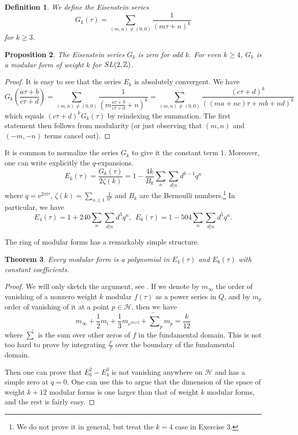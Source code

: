 \documentclass[11pt]{article}
\numberwithin{equation}{section}
\numberwithin{footnote}{section}
\newtheorem{thm}{Theorem}[section]
\newtheorem{prop}[thm]{Proposition}
\newtheorem{defn}[thm]{Definition}
\newcommand{\ee}{{\mathrm e}}
\newcommand{\ii}{{\mathrm i}}
\newcommand{\Z}{{\mathbb Z}}
\begin{document}
\smallskip
\begin{defn}\label{defG}
We define the Eisenstein series
$$G_k(\tau) =  \sum_{(m,n)\neq (0,0)} \frac 1{(m\tau + n)^{k}}$$
for $k\geq 3$. 
\end{defn}

\smallskip
\begin{prop}
The Eisenstein series $G_k$ is zero for odd $k$. For even $k\geq 4$, $G_k$ is a modular form of weight $k$ 
for  ${\rm SL}(2,\Z)$.
\end{prop}

\begin{proof}
It is easy to see that the series $E_k$ is absolutely convergent.
We have
$$
G_k\left(\frac {a\tau + b}{c\tau + d}\right) = \sum_{(m,n)\neq (0,0)} \frac 1{(m\frac {a\tau + b}{c\tau + d}+n)^k}
= \sum_{(m,n)\neq (0,0)} \frac {(c\tau+d)^k}{((ma+nc)\tau + mb+nd)^k}
$$
which equals $(c\tau+d)^k G_k(\tau)$
by reindexing the summation. The first statement then follows from modularity (or just observing that $(m,n)$ and $(-m,-n)$ terms cancel out).
\end{proof}

It is common to normalize the series $G_{k}$ to give it the constant term $1$. Moreover, one can write explicitly the 
$q$-expansions.
$$
E_k(\tau) = \frac {G_k(\tau)}{2\zeta(k)} = 1 - \frac {4k}{B_k} \sum_{n} \sum_{d|n} d^{k-1} q^n
$$
where $q=\ee^{2\pi\ii \tau}$, $\zeta(k) =\sum_{n\geq 1}\frac 1{n^k}$ and $B_k$ are the Bernoulli numbers.\footnote{ We do not prove it in general, but treat the $k=4$ case in Exercise 3.} In particular, we have
\begin{equation}\label{E4E6}
E_4(\tau) = 1 + 240  \sum_{n} \sum_{d|n} d^3 q^n,~~
E_6(\tau) = 1 - 504  \sum_{n} \sum_{d|n} d^5 q^n.
\end{equation}

\smallskip
The ring of modular forms has a remarkably simple structure.

\smallskip
\begin{thm}
Every modular form is a polynomial in $E_4(\tau)$ and $E_6(\tau)$ with constant coefficients.
\end{thm}

\begin{proof}
We will only sketch the argument, see \cite{Serre}. If we denote by $m_\infty$ the order of vanishing of a
nonzero weight $k$ modular $f(\tau)$ as a power series in $Q$, and by $m_p$ order of vanishing of it at a point $p\in \mathcal H$, then we have
\begin{equation}\label{sumSerre}
m_\infty + \frac 12 m_{\ii} + \frac 13 m_{\ee^{2\pi\ii/3}} +\tilde \sum_{p}m_p = \frac k{12}
\end{equation}
where $\tilde\sum$ is the sum over other zeros of $f$ in the fundamental domain.
This is not too hard to prove by integrating $\frac {f'}f$ over the boundary of the fundamental domain.

\smallskip
Then one can prove that $E_6^2- E_4^3$ is not vanishing anywhere on $\mathcal H$ and has a simple zero at $q=0$. One can use this to argue that the dimension of the space of weight $k+12$ modular forms is one larger than that of weight $k$ modular forms, and the rest is fairly easy.
\end{proof}
\end{document}

